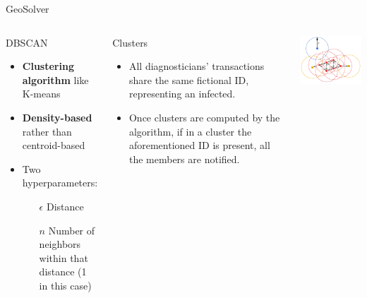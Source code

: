 \begin{frame}{GeoSolver}
    \begin{columns}
        \begin{block}{DBSCAN}
            \begin{itemize}
                \item \textbf{Clustering algorithm} like K-means
                \item \textbf{Density-based} rather than centroid-based
                \item Two hyperparameters:
                \begin{itemize}
                    \item[$\epsilon$] Distance
                    \item[$n$] Number of neighbors within that distance (1 in this case)
                \end{itemize}
            \end{itemize}
        \end{block}
        
        \vspace{5pt}
        
        \begin{block}{Clusters}
        \begin{itemize}
            \item All diagnosticians' transactions share the same fictional ID, representing an infected.
            \item Once clusters are computed by the algorithm, if in a cluster the aforementioned ID is present, all the members are notified.
        \end{itemize}
        \end{block}
        
    \column{0pt}
        
        \raggedleft
        \includegraphics[width = \linewidth]{images/dbscan.png}
    \end{columns}
\end{frame}